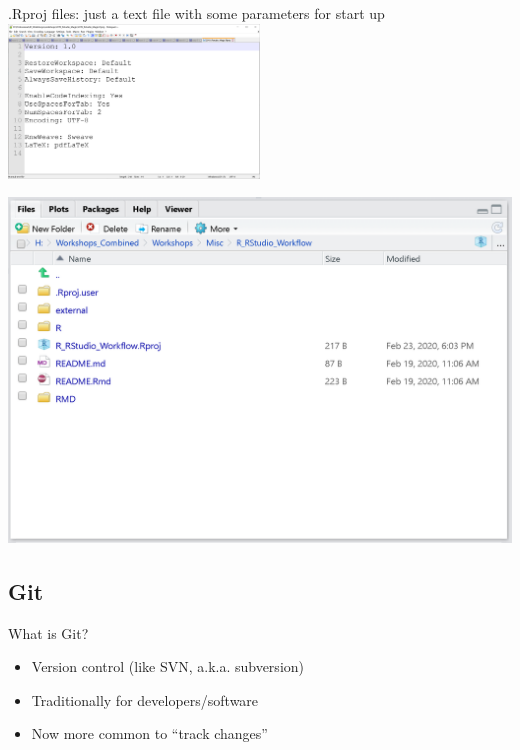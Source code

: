 \documentclass[
  ignorenonframetext,
]{beamer}
\providecommand{\tightlist}{%
  \setlength{\itemsep}{0pt}\setlength{\parskip}{0pt}}
\begin{document}
\begin{frame}

.Rproj files: just a text file with some parameters for start up
\includegraphics[width=0.5\textwidth,height=\textheight]{../external/images/Rproj_inside.PNG}

\end{frame}

\begin{frame}

\includegraphics{../external/images/this_project.PNG}

\end{frame}

\hypertarget{git}{%
\subsection{Git}\label{git}}

\begin{frame}{What is Git?}
\protect\hypertarget{what-is-git}{}

\begin{itemize}[<+->]
\tightlist
\item
  Version control (like SVN, a.k.a. subversion)
\item
  Traditionally for developers/software
\item
  Now more common to ``track changes''
\end{itemize}

\end{frame}
\end{document}
